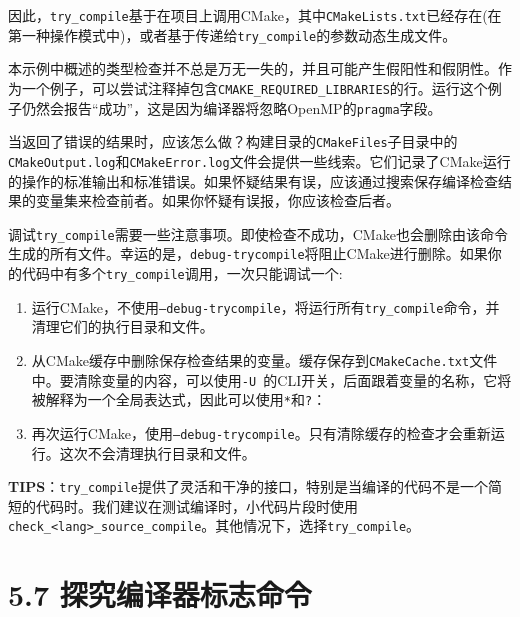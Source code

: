 因此，\texttt{try\_compile}基于在项目上调用CMake，其中\texttt{CMakeLists.txt}已经存在(在第一种操作模式中)，或者基于传递给\texttt{try\_compile}的参数动态生成文件。


本示例中概述的类型检查并不总是万无一失的，并且可能产生假阳性和假阴性。作为一个例子，可以尝试注释掉包含\texttt{CMAKE\_REQUIRED\_LIBRARIES}的行。运行这个例子仍然会报告“成功”，这是因为编译器将忽略OpenMP的\texttt{pragma}字段。

当返回了错误的结果时，应该怎么做？构建目录的\texttt{CMakeFiles}子目录中的\texttt{CMakeOutput.log}和\texttt{CMakeError.log}文件会提供一些线索。它们记录了CMake运行的操作的标准输出和标准错误。如果怀疑结果有误，应该通过搜索保存编译检查结果的变量集来检查前者。如果你怀疑有误报，你应该检查后者。

调试\texttt{try\_compile}需要一些注意事项。即使检查不成功，CMake也会删除由该命令生成的所有文件。幸运的是，\texttt{debug-trycompile}将阻止CMake进行删除。如果你的代码中有多个\texttt{try\_compile}调用，一次只能调试一个:

\begin{enumerate}
\item 运行CMake，不使用\texttt{--debug-trycompile}，将运行所有\texttt{try\_compile}命令，并清理它们的执行目录和文件。

\item 从CMake缓存中删除保存检查结果的变量。缓存保存到\texttt{CMakeCache.txt}文件中。要清除变量的内容，可以使用\texttt{-U }的CLI开关，后面跟着变量的名称，它将被解释为一个全局表达式，因此可以使用\texttt{*}和\texttt{?}：


\item 再次运行CMake，使用\texttt{--debug-trycompile}。只有清除缓存的检查才会重新运行。这次不会清理执行目录和文件。

\end{enumerate}

\begin{myInfoBox}
\textbf{TIPS}：\texttt{try\_compile}提供了灵活和干净的接口，特别是当编译的代码不是一个简短的代码时。我们建议在测试编译时，小代码片段时使用\texttt{check\_<lang>\_source\_compile}。其他情况下，选择\texttt{try\_compile}。
\end{myInfoBox}


\section{5.7 探究编译器标志命令}

